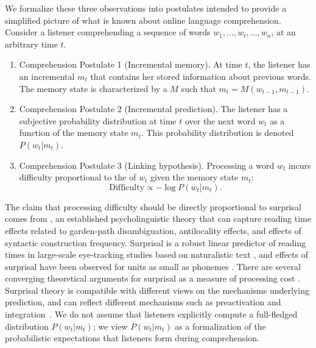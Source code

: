 We formalize these three observations into postulates intended to provide a simplified picture of what is known about online language comprehension. Consider a listener comprehending a sequence of words $w_1, \dots, w_t, \dots, w_n$, at an arbitrary time $t$.
\begin{enumerate}
    \item Comprehension Postulate 1 (Incremental memory). At time $t$, the listener has an incremental  $m_t$ that contains her stored information about previous words. The memory state is characterized by a  $M$ such that $m_t = M(w_{t-1}, m_{t-1})$.
    \item Comprehension Postulate 2 (Incremental prediction). The listener has a subjective probability distribution at time $t$ over the next word $w_t$ as a function of the memory state $m_t$. This probability distribution is denoted $P(w_t|m_t)$.
    \item Comprehension Postulate 3 (Linking hypothesis). Processing a word $w_t$ incurs difficulty proportional to the  of $w_t$ given the memory state $m_t$:
    \begin{equation}
    \label{eq:lossy-surp}
    \text{Difficulty} \propto -\log P(w_t | m_t).
\end{equation}
\end{enumerate}
The claim that processing difficulty should be directly proportional to surprisal comes from  \citep{hale2001probabilistic,levy2008expectation}, an established psycholinguistic theory that can capture reading time effects related to garden-path disambiguation, antilocality effects, and effects of syntactic construction frequency. Surprisal is a robust linear predictor of reading times in large-scale eye-tracking studies based on naturalistic text \citep{smith2013effect,goodkind-predictive-2018,frank2019interaction,aurnhammer2019evaluating,wilcox2020predictive}, and effects of surprisal have been observed for units as small as phonemes \citep{gwilliams2020neural}. There are several converging theoretical arguments for surprisal as a measure of processing cost \citep{levy2008expectation,smith2013effect}.
Surprisal theory is compatible with different views on the mechanisms underlying prediction, and can reflect different mechanisms such as preactivation and integration~\citep{kuperberg2016we}.
We do not assume that listeners explicitly compute a full-fledged distribution $P(w_t|m_t)$; we view $P(w_t|m_t)$ as a formalization of the probabilistic expectations that listeners form during comprehension.

